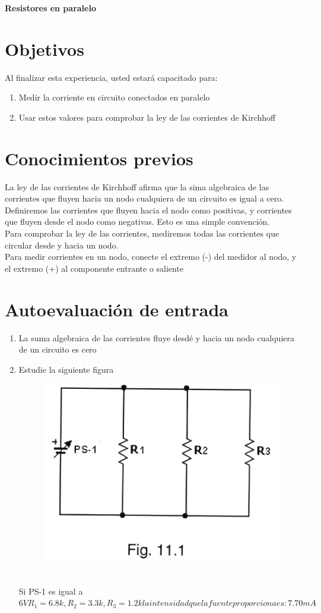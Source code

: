 \thispagestyle{fancy}
\begin{center}
	\LARGE{\textbf{Resistores en paralelo}}
\end{center}
\section{Objetivos}
Al finalizar esta experiencia, usted estará capacitado para:
\begin{enumerate}
	\item 	Medir la corriente en circuito conectados en paralelo
	\item	Usar estos valores para comprobar la ley de las corrientes de Kirchhoff
\end{enumerate}
\section{Conocimientos previos}
La ley de las corrientes de Kirchhoff afirma que la sima algebraica de las corrientes que fluyen hacia un nodo cualquiera de un circuito es igual a cero.
Definiremos las corrientes que fluyen hacia el nodo como positivas, y corrientes que fluyen desde el nodo como negativas. Esto es una simple convención. \\
Para comprobar la ley de las corrientes, mediremos todas las corrientes que circular desde y hacia un nodo.\\
Para medir corrientes en un nodo, conecte el extremo (-) del medidor al nodo, y el extremo (+) al componente entrante o saliente
\section{Autoevaluación de entrada}
\begin{enumerate}
	\item 	La suma algebraica de las corrientes fluye desdé y hacia un nodo cualquiera de un circuito es cero
	\item 	Estudie la siguiente figura 
	\begin{figure}[h]
		\centering
		\includegraphics[scale=0.2]{imagenes/1}
	\end{figure}
	\\ Si PS-1 es igual a $6V R_{1}=6.8k,R_{2}=3.3k,R_{3}=1.2k la intensidad que la fuente proporciona es: 7.70mA$
\end{enumerate}

